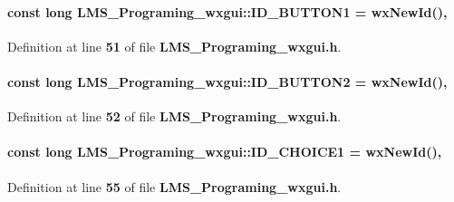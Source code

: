 \paragraph[{I\+D\+\_\+\+B\+U\+T\+T\+O\+N1}]{\setlength{\rightskip}{0pt plus 5cm}const long L\+M\+S\+\_\+\+Programing\+\_\+wxgui\+::\+I\+D\+\_\+\+B\+U\+T\+T\+O\+N1 = wx\+New\+Id()\hspace{0.3cm}{\ttfamily [static]}, {\ttfamily [protected]}}\label{classLMS__Programing__wxgui_a61868ec5b15c4f8c37e28685ab8cc93b}


Definition at line {\bf 51} of file {\bf L\+M\+S\+\_\+\+Programing\+\_\+wxgui.\+h}.

\paragraph[{I\+D\+\_\+\+B\+U\+T\+T\+O\+N2}]{\setlength{\rightskip}{0pt plus 5cm}const long L\+M\+S\+\_\+\+Programing\+\_\+wxgui\+::\+I\+D\+\_\+\+B\+U\+T\+T\+O\+N2 = wx\+New\+Id()\hspace{0.3cm}{\ttfamily [static]}, {\ttfamily [protected]}}\label{classLMS__Programing__wxgui_a057ca2f0ec7e12c3ef3546174b137a5f}


Definition at line {\bf 52} of file {\bf L\+M\+S\+\_\+\+Programing\+\_\+wxgui.\+h}.

\paragraph[{I\+D\+\_\+\+C\+H\+O\+I\+C\+E1}]{\setlength{\rightskip}{0pt plus 5cm}const long L\+M\+S\+\_\+\+Programing\+\_\+wxgui\+::\+I\+D\+\_\+\+C\+H\+O\+I\+C\+E1 = wx\+New\+Id()\hspace{0.3cm}{\ttfamily [static]}, {\ttfamily [protected]}}\label{classLMS__Programing__wxgui_a8dbe62af2992931ec0aa8450be2cf163}


Definition at line {\bf 55} of file {\bf L\+M\+S\+\_\+\+Programing\+\_\+wxgui.\+h}.

